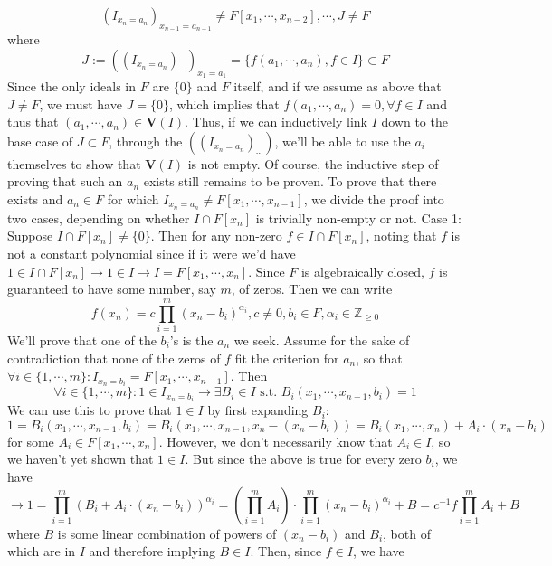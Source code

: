 \documentclass{article}
\newcommand*{\n}{\newline}
\newcommand*{\Fx}{\ensuremath{F[x_1, \cdots, x_n]}}
\newcommand*{\V}{\ensuremath{\mathbf{V}}}
\begin{document}
$$ (I_{x_n = a_n})_{x_{n - 1} = a_{n - 1}} \neq F[x_1, \cdots, x_{n - 2}], \cdots, J \neq F $$
where
$$ J := ((I_{x_n = a_n})_{\cdots})_{x_1 = a_1} = \{ f(a_1, \cdots, a_n), f \in I \} \subset F $$
Since the only ideals in $ F $ are $ \{ 0 \} $ and $ F $ itself, and if we assume as above that $ J \neq F $, we must have $ J = \{ 0 \} $, which implies that $ f(a_1, \cdots, a_n) = 0, \forall f \in I $ and thus that $ (a_1, \cdots, a_n) \in \V(I) $.
\n
Thus, if we can inductively link $ I $ down to the base case of $ J \subset F $, through the $ ((I_{x_n = a_n})_{\cdots}) $, we'll be able to use the $ a_i $ themselves to show that $ \V(I) $ is not empty. Of course, the inductive step of proving that such an $ a_n $ exists still remains to be proven. To prove that there exists and $ a_n \in F $ for which $ I_{x_n = a_n} \neq F[x_1, \cdots, x_{n - 1}] $, we divide the proof into two cases, depending on whether $ I \cap F[x_n] $ is trivially non-empty or not.
\n
Case 1: Suppose $ I \cap F[x_n] \neq \{ 0 \} $. Then for any non-zero $ f \in I \cap F[x_n] $, noting that $ f $ is not a constant polynomial since if it were we'd have $ 1 \in I \cap F[x_n] \rightarrow 1 \in I \rightarrow I = \Fx $. Since $ F $ is algebraically closed, $ f $ is guaranteed to have some number, say $ m $, of zeros. Then we can write
$$ f(x_n) = c \prod_{i = 1}^m (x_n - b_i)^{\alpha_i}, c \neq 0, b_i \in F, \alpha_i \in \mathbb{Z}_{\geq 0} $$
We'll prove that one of the $ b_i $'s is the $ a_n $ we seek. Assume for the sake of contradiction that none of the zeros of $ f $ fit the criterion for $ a_n $, so that $ \forall i \in \{ 1, \cdots, m \}: I_{x_n = b_i} = F[x_1, \cdots, x_{n - 1}] $. Then
$$ \forall i \in \{ 1, \cdots, m \}: 1 \in I_{x_n = b_i} \rightarrow \exists B_i \in I \text{ s.t. } B_i(x_1, \cdots, x_{n - 1}, b_i) = 1 $$
We can use this to prove that $ 1 \in I $ by first expanding $ B_i $:
$$ 1 = B_i(x_1, \cdots, x_{n - 1}, b_i) = B_i(x_1, \cdots, x_{n - 1}, x_n - (x_n - b_i)) = B_i(x_1, \cdots, x_n) + A_i \cdot (x_n - b_i) $$
for some $ A_i \in F [x_1, \cdots, x_n] $. However, we don't necessarily know that $ A_i \in I $, so we haven't yet shown that $ 1 \in I $. But since the above is true for every zero $ b_i $, we have
$$ \rightarrow 1 = \prod_{i = 1}^m (B_i + A_i \cdot (x_n - b_i))^{\alpha_i} = \left( \prod_{i = 1}^m A_i \right) \cdot \prod_{i = 1}^m (x_n - b_i)^{\alpha_i} + B = c^{-1} f \prod_{i = 1}^m A_i + B $$
where $ B $ is some linear combination of powers of $ (x_n - b_i) $ and $ B_i $, both of which are in $ I $ and therefore implying $ B \in I $. Then, since $ f \in I $, we have
\end{document}
